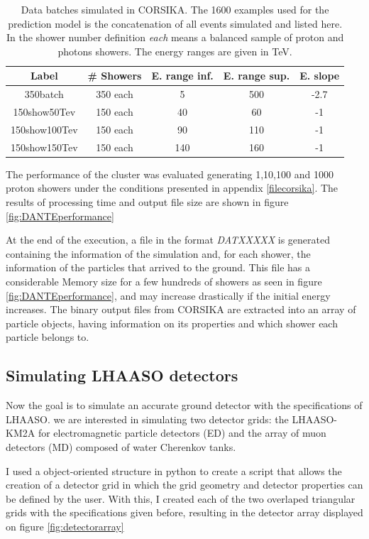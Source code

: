 \documentclass{article}
\begin{document}
\begin{table}[h!]
\centering
\begin{tabular}[]{c cccc}
\hline

  \textbf{Label}   & \textbf{\# Showers} & \textbf{E. range inf.} & \textbf{E. range sup.} & \textbf{E. slope}  \\
  \hline
  \hline
  350batch & 350 each & 5 & 500 & -2.7 \\
  150show50Tev& 150 each & 40 & 60 & -1 \\
  150show100Tev& 150 each & 90 & 110 & -1 \\
  150show150Tev& 150 each & 140 & 160 & -1 \\
  \hline
\end{tabular}
    \caption{Data batches simulated in CORSIKA. The 1600 examples used for the prediction model is the concatenation of all events simulated and listed here. In the shower number definition \textit{each} means a balanced sample of proton and photons showers. The energy ranges are given in TeV.}
    \label{tab:datalabels}
\end{table}

The performance of the cluster was evaluated generating 1,10,100 and 1000 proton showers under the conditions presented in appendix \ref{filecorsika}. The results of processing time and output file size are shown in figure \ref{fig:DANTEperformance}


At the end of the execution, a file in the format \textit{DATXXXXX} is generated containing the information of the simulation and, for each shower, the information of the particles that arrived to the ground. This file has a considerable Memory size for a few hundreds of showers as seen in figure \ref{fig:DANTEperformance}, and may increase drastically if the initial energy increases. The binary output files from CORSIKA are extracted into an array of particle objects, having  information on its properties and which shower each particle belongs to. 

\subsection{Simulating LHAASO detectors}
Now the goal is to simulate an accurate ground detector with the specifications of LHAASO. we are interested in simulating two detector grids: the LHAASO-KM2A for electromagnetic particle detectors (ED) and the array of muon detectors (MD)  composed of  water Cherenkov tanks.

I used a object-oriented structure in python to create a script that allows the creation of a detector grid in which the grid geometry and detector properties can be defined by the user. With this, I created each of the two overlaped triangular grids with the specifications given before, resulting in the detector array displayed on figure \ref{fig:detectorarray}
\end{document}
